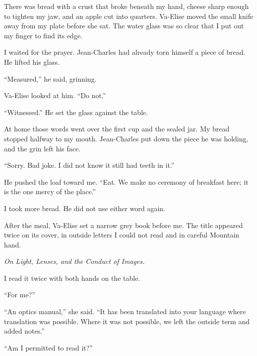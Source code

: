 There was bread with a crust that broke beneath my hand, cheese sharp enough to tighten my jaw, and an apple cut into quarters. Va-Elise moved the small knife away from my plate before she sat. The water glass was so clear that I put out my finger to find its edge.\par

I waited for the prayer. Jean-Charles had already torn himself a piece of bread. He lifted his glass.\par

``Measured,'' he said, grinning.\par

Va-Elise looked at him. ``Do not.''\par

``Witnessed.'' He set the glass against the table.\par

At home those words went over the first cup and the sealed jar. My bread stopped halfway to my mouth. Jean-Charles put down the piece he was holding, and the grin left his face.\par

``Sorry. Bad joke. I did not know it still had teeth in it.''\par

He pushed the loaf toward me. ``Eat. We make no ceremony of breakfast here; it is the one mercy of the place.''\par

I took more bread. He did not use either word again.\par

After the meal, Va-Elise set a narrow grey book before me. The title appeared twice on its cover, in outside letters I could not read and in careful Mountain hand.\par

\textit{On Light, Lenses, and the Conduct of Images.}\par

I read it twice with both hands on the table.\par

``For me?''\par

``An optics manual,'' she said. ``It has been translated into your language where translation was possible. Where it was not possible, we left the outside term and added notes.''\par

``Am I permitted to read it?''\par

